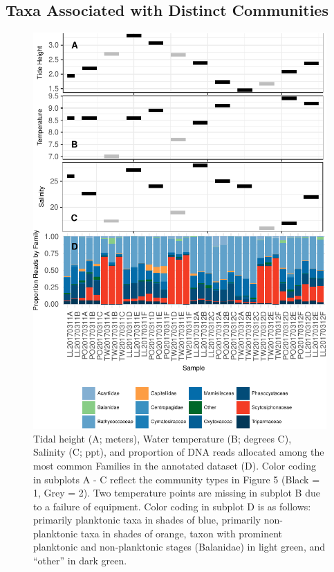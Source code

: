 \documentclass[fleqn,10pt,lineno]{wlpeerj} %
\begin{document}
\subsection{Taxa Associated with Distinct
Communities}\label{taxa-associated-with-distinct-communities}

\begin{figure}[!ht]

{\centering \includegraphics{figures/FIG6_multiplot_community_membership-1} 

}

\caption{\label{fig:fig6}Tidal height (A; meters), Water temperature (B; degrees C), Salinity (C; ppt), and proportion of DNA reads allocated among the most common Families in the annotated dataset (D). Color coding in subplots A - C reflect the community types in Figure 5 (Black = 1, Grey = 2). Two temperature points are missing in subplot B due to a failure of equipment. Color coding in subplot D is as follows: primarily planktonic taxa in shades of blue, primarily non-planktonic taxa in shades of orange, taxon with prominent planktonic and non-planktonic stages (Balanidae) in light green, and ``other'' in dark green.}\label{fig:FIG6_multiplot_community_membership}
\end{figure}
\end{document}
